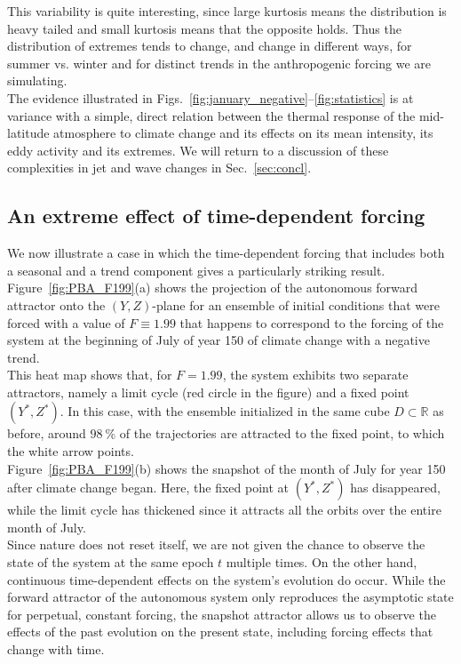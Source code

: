 \documentclass[%
 aip, cha,
 amsmath,amssymb,
 reprint,%
author-year,%
]{revtex4-1}
\newcommand{\0}{\mathbf 0}
\begin{document}
This variability is quite interesting, since  large kurtosis means the distribution is heavy tailed and small kurtosis means that the opposite holds. Thus the distribution of extremes tends to change, and change in different ways, for summer vs. winter and for distinct trends in the anthropogenic forcing we are simulating.\\
The evidence illustrated in Figs.~\ref{fig:january_negative}--\ref{fig:statistics} is at variance with a simple, direct relation between the thermal response of the mid-latitude atmosphere to climate change and its effects on its mean intensity, its eddy activity and its extremes. We will return to a discussion of these complexities in jet and wave changes in Sec.~\ref{sec:concl}.  

\subsection{An extreme effect of time-dependent forcing}
\label{sec:trend_ultima}
We now illustrate a case in which the time-dependent forcing that includes both a seasonal and a trend component gives a particularly striking result. Figure~\ref{fig:PBA_F199}(a) shows the projection of the autonomous forward attractor onto the $(Y,Z)$-plane for an ensemble of initial conditions that were forced with a value of $F \equiv 1.99$ that happens to correspond to the forcing of the system at the beginning of July of year 150 of climate change with a negative trend. \\
This heat map shows that, for $F = 1.99$, the system exhibits two separate attractors, namely a limit cycle (red circle in the figure) and a fixed point $(Y^*, Z^*)$. In this case, with the ensemble initialized in the same cube $D \subset \mathbb R$ as before, around $98~\%$ of the trajectories are attracted to the fixed point, to which the white arrow points. \\
Figure~\ref{fig:PBA_F199}(b) shows the snapshot of the month of July for year 150 after climate change began. Here, the fixed point at $(Y^*, Z^*)$ has disappeared, while the limit cycle has thickened since it attracts all the orbits over the entire month of July. \\
Since nature does not reset itself, we are not given the chance to observe the state of the system at the same epoch $t$ multiple times. On the other hand, continuous time-dependent effects on the system's evolution do occur. While the forward attractor of the autonomous system only reproduces the asymptotic state for perpetual, constant forcing, the snapshot attractor allows us to observe the effects of the past evolution on the present state, including forcing effects that change with time. 
\end{document}
